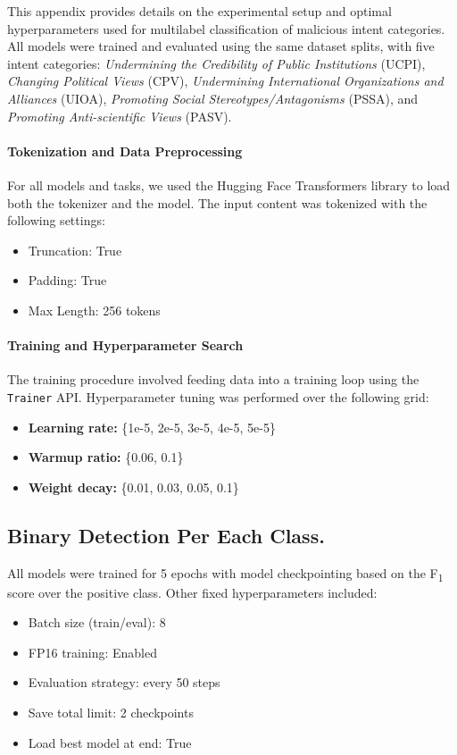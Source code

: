 \documentclass[11pt]{article}
\begin{document}
This appendix provides details on the experimental setup and optimal hyperparameters used for multilabel classification of malicious intent categories. All models were trained and evaluated using the same dataset splits, with five intent categories:  \textit{Undermining the Credibility of Public Institutions} (UCPI), \textit{Changing Political Views} (CPV), \textit{Undermining International Organizations and Alliances} (UIOA), \textit{Promoting Social Stereotypes/Antagonisms} (PSSA), and \textit{Promoting Anti-scientific Views} (PASV).


\paragraph{Tokenization and Data Preprocessing}

For all models and tasks, we used the Hugging Face Transformers library to load both the tokenizer and the model. The input content was tokenized with the following settings:
\begin{itemize}[nosep, leftmargin=*]
    \item Truncation: True
    \item Padding: True
    \item Max Length: 256 tokens
\end{itemize}

\paragraph{Training and Hyperparameter Search}

The training procedure involved feeding data into a training loop using the \texttt{Trainer} API. Hyperparameter tuning was performed over the following grid:

\begin{itemize}[nosep, leftmargin=*]
    \item \textbf{Learning rate:} \{1e-5, 2e-5, 3e-5, 4e-5, 5e-5\}
    \item \textbf{Warmup ratio:} \{0.06, 0.1\}
    \item \textbf{Weight decay:} \{0.01, 0.03, 0.05, 0.1\}
\end{itemize}


\subsection{Binary Detection Per Each Class.}

All models were trained for 5 epochs with model checkpointing based on the F\textsubscript{1} score over the positive class. Other fixed hyperparameters included:
\begin{itemize}[nosep, leftmargin=*]
    \item Batch size (train/eval): 8
    \item FP16 training: Enabled
    \item Evaluation strategy: every 50 steps
    \item Save total limit: 2 checkpoints
    \item Load best model at end: True
\end{itemize}
\end{document}
